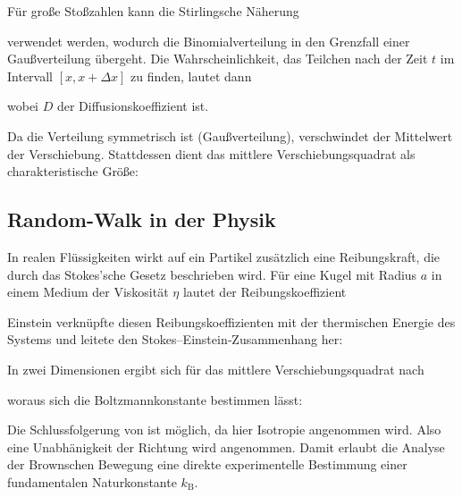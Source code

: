 
Für große Stoßzahlen kann die Stirlingsche Näherung


verwendet werden, wodurch die Binomialverteilung in den Grenzfall einer Gaußverteilung übergeht. Die Wahrscheinlichkeit, das Teilchen nach der Zeit \(t\) im Intervall \([x, x+\Delta x]\) zu finden, lautet dann


wobei \(D\) der Diffusionskoeffizient ist.

Da die Verteilung symmetrisch ist (Gaußverteilung), verschwindet der Mittelwert der Verschiebung. Stattdessen dient das mittlere Verschiebungsquadrat als charakteristische Größe:


\subsection{Random-Walk in der Physik} \label{ssec:RndWalkPhys}

In realen Flüssigkeiten wirkt auf ein Partikel zusätzlich eine Reibungskraft, die durch das Stokes’sche Gesetz beschrieben wird. Für eine Kugel mit Radius \(a\) in einem Medium der Viskosität \(\eta\) lautet der Reibungskoeffizient


Einstein verknüpfte diesen Reibungskoeffizienten mit der thermischen Energie des Systems und leitete den Stokes–Einstein‑Zusammenhang her:


In zwei Dimensionen ergibt sich für das mittlere Verschiebungsquadrat nach  


woraus sich die Boltzmannkonstante bestimmen lässt:


Die Schlussfolgerung von  ist möglich, da hier Isotropie angenommen wird. Also eine Unabhänigkeit der Richtung wird angenommen. 
Damit erlaubt die Analyse der Brownschen Bewegung eine direkte experimentelle Bestimmung einer fundamentalen Naturkonstante $k_{\mathrm{B}}$.


